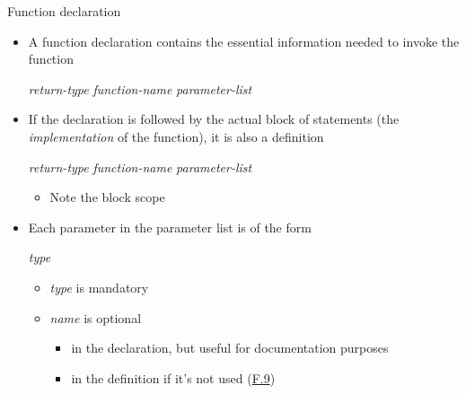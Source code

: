 \begin{frame}[fragile]{Function declaration}

  \begin{itemize}[<+->]
  \item A function \alert{declaration} contains the essential information needed
    to invoke the function

    \textit{return-type} \textit{function-name} \code{(} \textit{parameter-list} \code{);}

  \item If the declaration is followed by the actual block of statements (the
    \textit{implementation} of the function), it is also a \alert{definition}

    \textit{return-type} \textit{function-name} \code{(} \textit{parameter-list} \code{) \{ \ddd{} \}}

    \begin{itemize}
    \item Note the block scope
    \end{itemize}

  \item Each parameter in the parameter list is of the form

    \textit{type }

    \begin{itemize}
    \item \textit{type} is mandatory
    \item \textit{name} is optional
      \begin{itemize}
      \item in the declaration, but useful for documentation purposes
      \item in the definition if it's not used
        (\href{https://isocpp.github.io/CppCoreGuidelines/CppCoreGuidelines#f9-unused-parameters-should-be-unnamed}{F.9})
      \end{itemize}

    \end{itemize}
    

  \end{itemize}
\end{frame}

